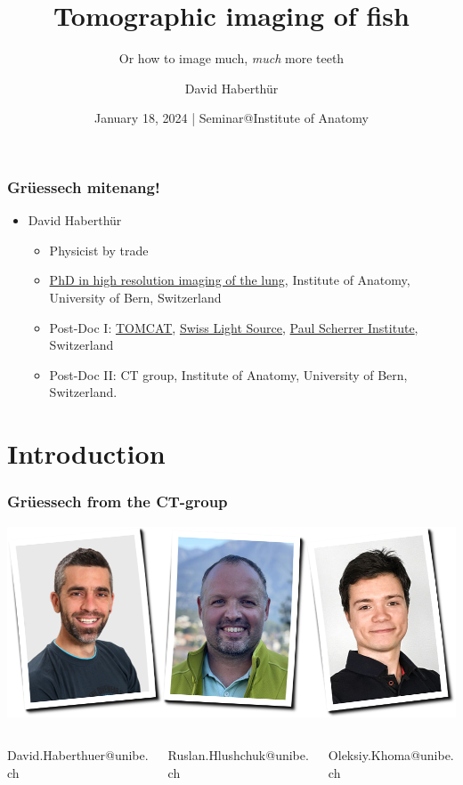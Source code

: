 \documentclass[aspectratio=169,10pt]{beamer}
\title{Tomographic imaging of fish}
\subtitle{Or how to image much, \emph{much} more teeth}
\author{David Haberthür}
\institute{Institute of Anatomy\\Universität Bern}
\date{January 18, 2024 | Seminar@Institute of Anatomy}
\newcommand{\imageheight}{0.618\paperheight}%
\newcommand{\uct}{{\textmu}CT\xspace}%
\begin{document}
{%
	\begin{frame}[noframenumbering]
		\maketitle
	\end{frame}%
}

\begin{frame}
	\frametitle{Grüessech mitenang!}
	\begin{itemize}
		\item David Haberthür
		\begin{itemize}
			\item Physicist by trade
			\item \href{https://boris.unibe.ch/2619/}{PhD in high resolution imaging of the lung}, Institute of Anatomy, University of Bern, Switzerland
			\item Post-Doc I: \href{https://www.psi.ch/sls/tomcat/}{TOMCAT}, \href{https://www.psi.ch/sls/}{Swiss Light Source}, \href{https://www.psi.ch/}{Paul Scherrer Institute}, Switzerland
			\item Post-Doc II: \uct{} group, Institute of Anatomy, University of Bern, Switzerland.
		\end{itemize}
	\end{itemize}
\end{frame}

\section{Introduction}
\begin{frame}
	\frametitle{Grüessech from the \uct-group}
	\centering
	\includegraphics[height=\imageheight]{./images/team}
		\begin{columns}
		\hfill\begin{column}{0.33\textwidth}
			\centering%
			David{\color{ubRed!61.8}.}Haberthuer{\color{ubRed!61.8}@unibe.ch}%
		\end{column}
		\begin{column}{0.33\textwidth}
			\centering%
			Ruslan{\color{ubRed!61.8}.}Hlushchuk{\color{ubRed!61.8}@unibe.ch}%
		\end{column}
		\begin{column}{0.33\textwidth}
			\centering%
			Oleksiy{\color{ubRed!61.8}.}Khoma{\color{ubRed!61.8}@unibe.ch}%
		\end{column}\hfill%
	\end{columns}
\end{frame}
\end{document}
